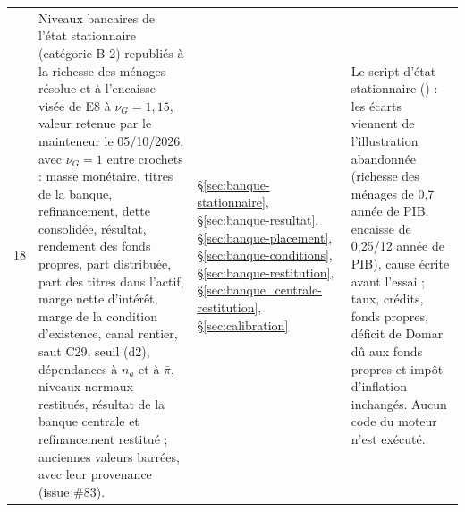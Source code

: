 \documentclass[11pt,a4paper]{article}
\newcommand{\code}[1]{\texttt{\detokenize{#1}}}
\begin{document}
\begin{center}
\begin{longtable}{p{0.5cm}>{\raggedright\arraybackslash}p{6.3cm}>{\raggedright\arraybackslash}p{2.1cm}>{\raggedright\arraybackslash}p{5.8cm}}
18 & Niveaux bancaires de l'état stationnaire (catégorie B-2) republiés à la richesse des ménages résolue et à l'encaisse visée de E8 à $\nu_G = 1{,}15$, valeur retenue par le mainteneur le 05/10/2026, avec $\nu_G = 1$ entre crochets : masse monétaire, titres de la banque, refinancement, dette consolidée, résultat, rendement des fonds propres, part distribuée, part des titres dans l'actif, marge nette d'intérêt, marge de la condition d'existence, canal rentier, saut C29, seuil (d2), dépendances à $n_a$ et à $\bar\pi$, niveaux normaux restitués, résultat de la banque centrale et refinancement restitué ; anciennes valeurs barrées, avec leur provenance (issue \#83). & \S\ref{sec:banque-stationnaire}, \S\ref{sec:banque-resultat}, \S\ref{sec:banque-placement}, \S\ref{sec:banque-conditions}, \S\ref{sec:banque-restitution}, \S\ref{sec:banque_centrale-restitution}, \S\ref{sec:calibration} & Le script d'état stationnaire (\code{outils/etat_stationnaire.py}) : les écarts viennent de l'illustration abandonnée (richesse des ménages de 0,7 année de PIB, encaisse de 0,25/12 année de PIB), cause écrite avant l'essai ; taux, crédits, fonds propres, déficit de Domar dû aux fonds propres et impôt d'inflation inchangés. Aucun code du moteur n'est exécuté.\\

\end{longtable}
\end{center}
\end{document}
